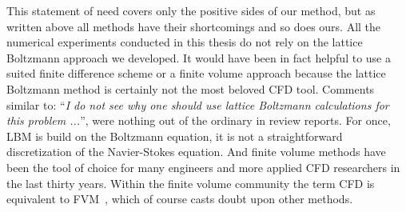 This statement of need covers only the positive sides of our method, but as written above all methods have their shortcomings and so does ours.
All the numerical experiments conducted in this thesis do not rely on the lattice Boltzmann approach we developed.
It would have been in fact helpful to use a suited finite difference scheme or a finite volume approach because the lattice Boltzmann method is certainly not the most beloved CFD tool.
Comments similar to: ``\textit{I do not see why one should use lattice Boltzmann calculations for this problem ...}'', were nothing out of the ordinary in review reports.
For once, LBM is build on the Boltzmann equation, it is not a straightforward discretization of the Navier-Stokes equation. 
And finite volume methods have been the tool of choice for many engineers and more applied CFD researchers in the last thirty years. 
Within the finite volume community the term CFD is equivalent to FVM~\cite{greenshieldsNotesComputationalFluid2022}, which of course casts doubt upon other methods. 
 
